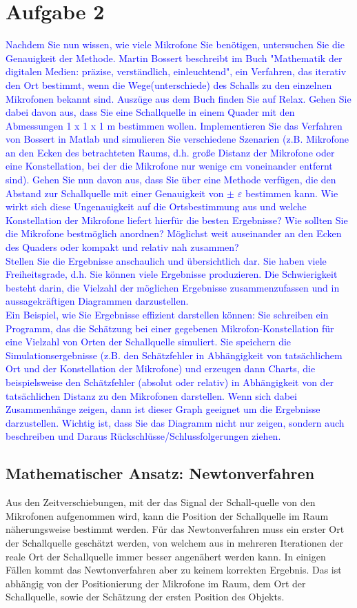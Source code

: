 \section{Aufgabe 2}
\textcolor{blue}{Nachdem Sie nun wissen, wie viele Mikrofone Sie benötigen, untersuchen Sie die Genauigkeit der Methode. Martin Bossert beschreibt im Buch "Mathematik der digitalen Medien: präzise, verständlich, einleuchtend", ein Verfahren, das iterativ den Ort bestimmt, wenn die Wege(unterschiede) des Schalls zu den einzelnen Mikrofonen bekannt sind. Auszüge aus dem Buch finden Sie auf Relax. 
Gehen Sie dabei davon aus, dass Sie eine Schallquelle in einem Quader mit den Abmessungen 1 x 1 x 1 m bestimmen wollen.  Implementieren Sie das Verfahren von Bossert in Matlab und simulieren Sie verschiedene Szenarien (z.B. Mikrofone an den Ecken des betrachteten Raums, d.h. große Distanz der Mikrofone oder eine Konstellation, bei der die Mikrofone nur wenige cm voneinander entfernt sind). Gehen Sie nun davon aus, dass Sie über eine Methode verfügen, die den Abstand zur Schallquelle mit einer Genauigkeit von $\pm$ $\varepsilon$ bestimmen kann. Wie wirkt sich diese Ungenauigkeit auf die Ortsbestimmung aus und welche Konstellation der Mikrofone liefert hierfür die besten Ergebnisse? Wie sollten Sie die Mikrofone bestmöglich anordnen?  Möglichst weit auseinander an den Ecken des Quaders oder kompakt und relativ nah zusammen? \\
Stellen Sie die Ergebnisse anschaulich und übersichtlich dar. Sie haben viele Freiheitsgrade, d.h. Sie können viele Ergebnisse produzieren. Die Schwierigkeit besteht darin, die Vielzahl der möglichen Ergebnisse zusammenzufassen und in aussagekräftigen Diagrammen darzustellen. \\
Ein Beispiel, wie Sie Ergebnisse effizient darstellen können: Sie schreiben ein Programm, das die Schätzung bei einer gegebenen Mikrofon-Konstellation für eine Vielzahl von Orten der Schallquelle simuliert. Sie speichern die Simulationsergebnisse (z.B. den Schätzfehler in Abhängigkeit von tatsächlichem Ort und der Konstellation der Mikrofone) und erzeugen dann Charts, die beispielsweise den Schätzfehler (absolut oder relativ) in Abhängigkeit von der tatsächlichen Distanz zu den Mikrofonen darstellen. Wenn sich dabei Zusammenhänge zeigen, dann ist dieser Graph geeignet um die Ergebnisse darzustellen. Wichtig ist, dass Sie das Diagramm nicht nur zeigen, sondern auch beschreiben und Daraus Rückschlüsse/Schlussfolgerungen ziehen.}
\subsection{Mathematischer Ansatz: Newtonverfahren}
Aus den Zeitverschiebungen, mit der das Signal der Schall-quelle von den Mikrofonen aufgenommen wird, kann die Position der Schallquelle im Raum näherungsweise bestimmt werden. Für das Newtonverfahren muss ein erster Ort der Schallquelle geschätzt werden, von welchem aus in mehreren Iterationen der reale Ort der Schallquelle immer besser angenähert werden kann. In einigen Fällen kommt das Newtonverfahren aber zu keinem korrekten Ergebnis. Das ist abhängig von der Positionierung der Mikrofone im Raum, dem Ort der Schallquelle, sowie der Schätzung der ersten Position des Objekts. 

